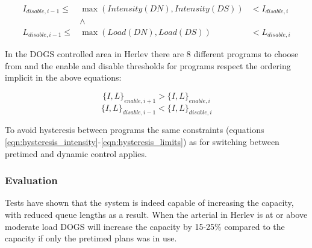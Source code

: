 \begin{eqnarray*}
I_{disable,i-1} \leq & \max(Intensity(DN),Intensity(DS)) & < I_{disable,i} \\
& \wedge & \\
L_{disable,i-1} \leq & \max(Load(DN),Load(DS))  & < L_{disable,i}
\end{eqnarray*}

In the DOGS controlled area in Herlev there are 8 different programs to choose from and the enable and disable thresholds for programs respect the ordering implicit in the above equations:

$$\lbrace I,L \rbrace_{enable,i+1} > \lbrace I,L \rbrace_{enable,i}$$
$$\lbrace I,L \rbrace_{disable,i-1} < \lbrace I,L \rbrace_{disable,i}$$

To avoid hysteresis between programs the same constraints (equations \ref{eqn:hysteresis_intensity}-\ref{eqn:hysteresis_limits}) as for switching between pretimed and dynamic control applies.

\subsubsection*{Evaluation}

Tests have shown that the system is indeed capable of increasing the
capacity, with reduced queue lengths as a result. When the arterial in
Herlev is at or above moderate load DOGS will increase the capacity by
15-25\% compared to the capacity if only the pretimed plans was in
use.
